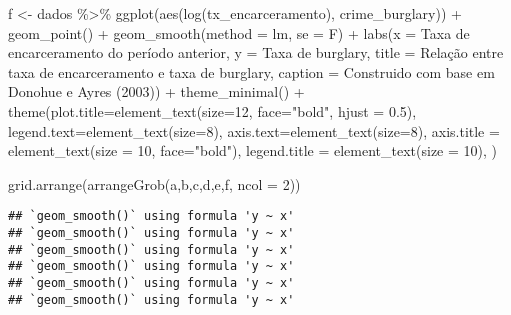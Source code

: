 \documentclass[
]{article}
\newenvironment{Shaded}{\begin{snugshade}}{\end{snugshade}}
\newcommand{\AttributeTok}[1]{\textcolor[rgb]{0.77,0.63,0.00}{#1}}
\newcommand{\DecValTok}[1]{\textcolor[rgb]{0.00,0.00,0.81}{#1}}
\newcommand{\FloatTok}[1]{\textcolor[rgb]{0.00,0.00,0.81}{#1}}
\newcommand{\FunctionTok}[1]{\textcolor[rgb]{0.00,0.00,0.00}{#1}}
\newcommand{\NormalTok}[1]{#1}
\newcommand{\OtherTok}[1]{\textcolor[rgb]{0.56,0.35,0.01}{#1}}
\newcommand{\SpecialCharTok}[1]{\textcolor[rgb]{0.00,0.00,0.00}{#1}}
\newcommand{\StringTok}[1]{\textcolor[rgb]{0.31,0.60,0.02}{#1}}
\begin{document}
\begin{Shaded}
\begin{Highlighting}[]
\NormalTok{f }\OtherTok{\textless{}{-}}\NormalTok{ dados }\SpecialCharTok{\%\textgreater{}\%} 
  \FunctionTok{ggplot}\NormalTok{(}\FunctionTok{aes}\NormalTok{(}\FunctionTok{log}\NormalTok{(tx\_encarceramento), crime\_burglary)) }\SpecialCharTok{+}
  \FunctionTok{geom\_point}\NormalTok{() }\SpecialCharTok{+} 
  \FunctionTok{geom\_smooth}\NormalTok{(}\AttributeTok{method =} \StringTok{\textquotesingle{}lm\textquotesingle{}}\NormalTok{, }\AttributeTok{se =}\NormalTok{ F) }\SpecialCharTok{+}
  \FunctionTok{labs}\NormalTok{(}\AttributeTok{x =} \StringTok{\textquotesingle{}Taxa de encarceramento do período anterior\textquotesingle{}}\NormalTok{,}
       \AttributeTok{y =} \StringTok{\textquotesingle{}Taxa de burglary\textquotesingle{}}\NormalTok{,}
       \AttributeTok{title =} \StringTok{\textquotesingle{}Relação entre taxa de encarceramento e taxa de burglary\textquotesingle{}}\NormalTok{,}
       \AttributeTok{caption =} \StringTok{\textquotesingle{}Construido com base em Donohue e Ayres (2003)\textquotesingle{}}\NormalTok{) }\SpecialCharTok{+} 
  \FunctionTok{theme\_minimal}\NormalTok{() }\SpecialCharTok{+}
  \FunctionTok{theme}\NormalTok{(}\AttributeTok{plot.title=}\FunctionTok{element\_text}\NormalTok{(}\AttributeTok{size=}\DecValTok{12}\NormalTok{, }\AttributeTok{face=}\StringTok{"bold"}\NormalTok{, }\AttributeTok{hjust =} \FloatTok{0.5}\NormalTok{),}
        \AttributeTok{legend.text=}\FunctionTok{element\_text}\NormalTok{(}\AttributeTok{size=}\DecValTok{8}\NormalTok{),}
        \AttributeTok{axis.text=}\FunctionTok{element\_text}\NormalTok{(}\AttributeTok{size=}\DecValTok{8}\NormalTok{),}
        \AttributeTok{axis.title =} \FunctionTok{element\_text}\NormalTok{(}\AttributeTok{size =} \DecValTok{10}\NormalTok{, }\AttributeTok{face=}\StringTok{"bold"}\NormalTok{),}
        \AttributeTok{legend.title =} \FunctionTok{element\_text}\NormalTok{(}\AttributeTok{size =} \DecValTok{10}\NormalTok{),}
\NormalTok{        )}

\FunctionTok{grid.arrange}\NormalTok{(}\FunctionTok{arrangeGrob}\NormalTok{(a,b,c,d,e,f, }\AttributeTok{ncol =} \DecValTok{2}\NormalTok{)) }
\end{Highlighting}
\end{Shaded}

\begin{verbatim}
## `geom_smooth()` using formula 'y ~ x'
## `geom_smooth()` using formula 'y ~ x'
## `geom_smooth()` using formula 'y ~ x'
## `geom_smooth()` using formula 'y ~ x'
## `geom_smooth()` using formula 'y ~ x'
## `geom_smooth()` using formula 'y ~ x'
\end{verbatim}
\end{document}
